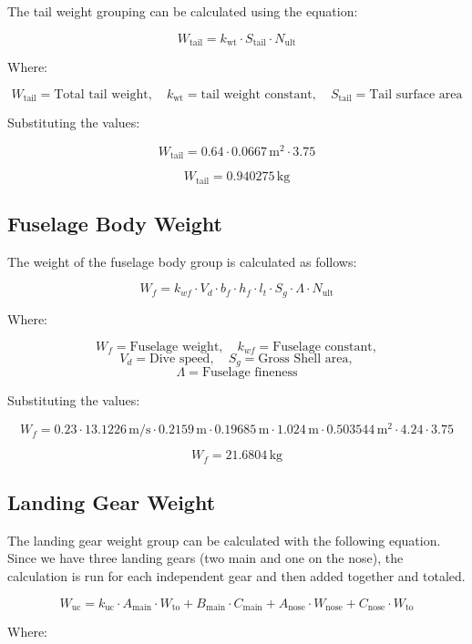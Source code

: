\documentclass[12pt]{report}
\begin{document}
The tail weight grouping can be calculated using the equation:

\[
W_{\text{tail}} = k_{\text{wt}} \cdot S_{\text{tail}} \cdot N_{\text{ult}}
\]

Where:

\[
W_{\text{tail}} = \text{Total tail weight}, \quad k_{\text{wt}} = \text{tail weight constant}, \quad S_{\text{tail}} = \text{Tail surface area}
\]

Substituting the values:

\[
W_{\text{tail}} = 0.64 \cdot 0.0667 \, \text{m}^2 \cdot 3.75
\]

\[
W_{\text{tail}} = 0.940275 \, \text{kg}
\]

\subsection{Fuselage Body Weight}

The weight of the fuselage body group is calculated as follows:

\[
W_f = k_{wf} \cdot V_d \cdot b_f \cdot h_f \cdot l_t \cdot S_g \cdot \Lambda \cdot N_{\text{ult}}
\]

Where:

\[
W_f = \text{Fuselage weight}, \quad k_{wf} = \text{Fuselage constant}, 
\]
\[
V_d = \text{Dive speed}, \quad S_g = \text{Gross Shell area}, 
\]
\[
\Lambda = \text{Fuselage fineness}
\]


Substituting the values:

\[
W_f = 0.23 \cdot 13.1226 \, \text{m/s} \cdot 0.2159 \, \text{m} \cdot 0.19685 \, \text{m} \cdot 1.024 \, \text{m} \cdot 0.503544 \, \text{m}^2 \cdot 4.24 \cdot 3.75
\]

\[
W_f = 21.6804 \, \text{kg}
\]

\subsection{Landing Gear Weight}

The landing gear weight group can be calculated with the following equation. Since we have three landing gears (two main and one on the nose), the calculation is run for each independent gear and then added together and totaled.

\[
W_{\text{uc}} = k_{\text{uc}} \cdot A_{\text{main}} \cdot W_{\text{to}} + B_{\text{main}} \cdot C_{\text{main}} + A_{\text{nose}} \cdot W_{\text{nose}} + C_{\text{nose}} \cdot W_{\text{to}}
\]

Where:
\end{document}
